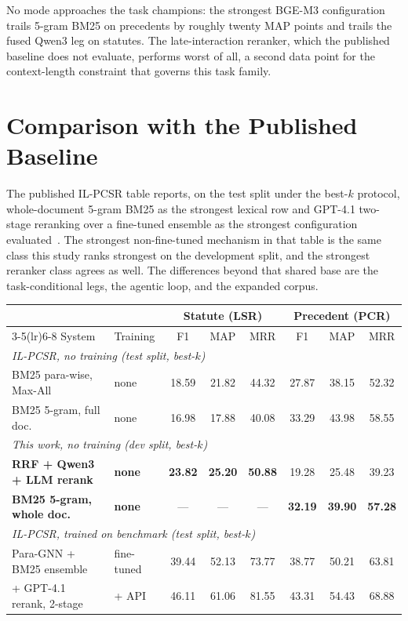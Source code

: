 \documentclass{mnnit}
\makeatletter
\newcommand{\tabcaption}[1]{\def\@captype{table}\caption{#1}}
\makeatother
\begin{document}
No mode approaches the task champions: the strongest BGE-M3
configuration trails 5-gram BM25 on precedents by roughly twenty
MAP points and trails the fused Qwen3 leg on statutes. The
late-interaction reranker, which the published baseline does not
evaluate, performs worst of all, a second data point for the
context-length constraint that governs this task family.

\section{Comparison with the Published Baseline}
The published IL-PCSR table reports, on the test split under the
best-$k$ protocol, whole-document 5-gram BM25 as the strongest
lexical row and GPT-4.1 two-stage reranking over a fine-tuned
ensemble as the strongest configuration evaluated~\cite{ilpcsr}.
The strongest non-fine-tuned mechanism in that table is the same
class this study ranks strongest on the development split, and
the strongest reranker class agrees as well. The differences
beyond that shared base are the task-conditional legs, the
agentic loop, and the expanded corpus.

\begin{center}
\footnotesize
\setlength{\tabcolsep}{4pt}
\tabcaption{IL-PCSR rows against the assembled legs. Every block
reports the best per-configuration depth; IL-PCSR rows measure
the test split, this work the development split.}
\label{tab:baseline}
\vspace{2mm}
\begin{tabular}{ll ccc ccc}
\toprule
 & & \multicolumn{3}{c}{Statute (LSR)} & \multicolumn{3}{c}{Precedent (PCR)} \\
\cmidrule(lr){3-5}\cmidrule(lr){6-8}
System & Training & F1 & MAP & MRR & F1 & MAP & MRR \\
\midrule
\multicolumn{8}{l}{\emph{IL-PCSR, no training (test split, best-$k$)}}\\
BM25 para-wise, Max-All & none & 18.59 & 21.82 & 44.32 & 27.87 & 38.15 & 52.32 \\
BM25 5-gram, full doc. & none & 16.98 & 17.88 & 40.08 & 33.29 & 43.98 & 58.55 \\
\midrule
\multicolumn{8}{l}{\emph{This work, no training (dev split, best-$k$)}}\\
\textbf{RRF + Qwen3 + LLM rerank} & \textbf{none} & \textbf{23.82} & \textbf{25.20} & \textbf{50.88} & 19.28 & 25.48 & 39.23 \\
\textbf{BM25 5-gram, whole doc.} & \textbf{none} & --- & --- & --- & \textbf{32.19} & \textbf{39.90} & \textbf{57.28} \\
\midrule
\multicolumn{8}{l}{\emph{IL-PCSR, trained on benchmark (test split, best-$k$)}}\\
Para-GNN + BM25 ensemble & fine-tuned & 39.44 & 52.13 & 73.77 & 38.77 & 50.21 & 63.81 \\
\quad + GPT-4.1 rerank, 2-stage & + API & 46.11 & 61.06 & 81.55 & 43.31 & 54.43 & 68.88 \\
\bottomrule
\end{tabular}
\end{center}
\end{document}
